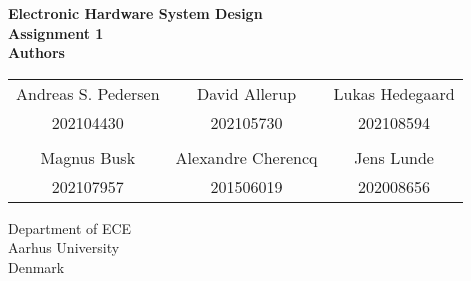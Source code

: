 \documentclass[../main.tex]{subfiles}
\begin{document}
\thispagestyle{empty}

\begin{titlepage}
    \begin{center}
        \vspace*{20pt}
        \textbf{\huge{Electronic Hardware System Design}} \\
        \vspace*{20pt}
        \textbf{\large{Assignment 1}} \\
        \vspace*{50pt}
        \textbf{\Large{Authors}} \\
        \vspace{20pt}
        \begin{tabular}{c c c}
            Andreas S. Pedersen & David Allerup & Lukas Hedegaard \\
            202104430 & 202105730 & 202108594 \\
             && \\
            Magnus Busk & Alexandre Cherencq & Jens Lunde \\
            202107957 & 201506019 & 202008656 \\
        \end{tabular}

        \vfill
        \vspace*{3cm}
        Department of ECE\\
        Aarhus University\\
        Denmark
    \end{center}
\end{titlepage}
\end{document}
